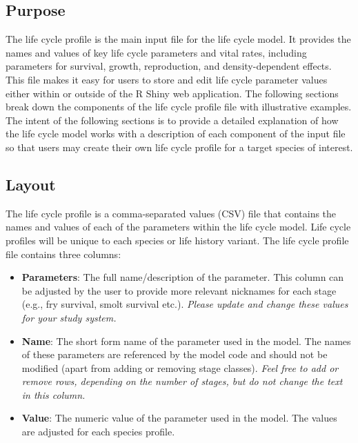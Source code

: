 \documentclass[
  letterpaper,
  DIV=11,
  numbers=noendperiod]{scrreprt}
\providecommand{\tightlist}{%
  \setlength{\itemsep}{0pt}\setlength{\parskip}{0pt}}
\begin{document}
\subsection{Purpose}\label{purpose-3}

The life cycle profile is the main input file for the life cycle model.
It provides the names and values of key life cycle parameters and vital
rates, including parameters for survival, growth, reproduction, and
density-dependent effects. This file makes it easy for users to store
and edit life cycle parameter values either within or outside of the R
Shiny web application. The following sections break down the components
of the life cycle profile file with illustrative examples. The intent of
the following sections is to provide a detailed explanation of how the
life cycle model works with a description of each component of the input
file so that users may create their own life cycle profile for a target
species of interest.

\subsection{Layout}\label{layout-2}

The life cycle profile is a comma-separated values (CSV) file that
contains the names and values of each of the parameters within the life
cycle model. Life cycle profiles will be unique to each species or life
history variant. The life cycle profile file contains three columns:

\begin{itemize}
\tightlist
\item
  \textbf{Parameters}: The full name/description of the parameter. This
  column can be adjusted by the user to provide more relevant nicknames
  for each stage (e.g., fry survival, smolt survival etc.). \emph{Please
  update and change these values for your study system.}
\item
  \textbf{Name}: The short form name of the parameter used in the model.
  The names of these parameters are referenced by the model code and
  should not be modified (apart from adding or removing stage classes).
  \emph{Feel free to add or remove rows, depending on the number of
  stages, but do not change the text in this column.}
\item
  \textbf{Value}: The numeric value of the parameter used in the model.
  The values are adjusted for each species profile.
\end{itemize}
\end{document}
